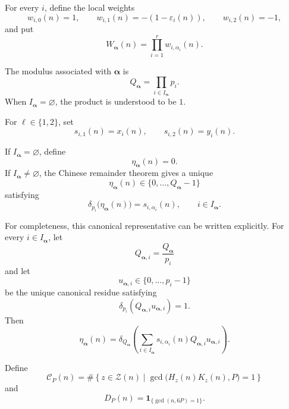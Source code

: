 \documentclass[12pt]{article}
\numberwithin{equation}{section}
\theoremstyle{definition}
\theoremstyle{remark}
\newcommand{\one}[1]{\mathbf 1_{\{#1\}}}
\newcommand{\Ccal}{\mathcal C}
\newcommand{\Zcal}{\mathcal Z}
\begin{document}
For every $i$, define the local weights
\begin{equation}
\label{eq:local-weights}
w_{i,0}(n)=1,
\qquad
w_{i,1}(n)=-(1-\varepsilon_i(n)),
\qquad
w_{i,2}(n)=-1,
\end{equation}
and put
\begin{equation}
\label{eq:global-weight}
W_{\boldsymbol\alpha}(n)
=
\prod_{i=1}^{r}w_{i,\alpha_i}(n).
\end{equation}

The modulus associated with $\boldsymbol\alpha$ is
\begin{equation}
\label{eq:Q-alpha}
Q_{\boldsymbol\alpha}
=
\prod_{i\in I_{\boldsymbol\alpha}}p_i.
\end{equation}
When $I_{\boldsymbol\alpha}=\varnothing$, the product is
understood to be $1$.

For $\ell\in\{1,2\}$, set
\begin{equation}
\label{eq:s-definition}
s_{i,1}(n)=x_i(n),
\qquad
s_{i,2}(n)=y_i(n).
\end{equation}

If $I_{\boldsymbol\alpha}=\varnothing$, define
\[
\eta_{\boldsymbol\alpha}(n)=0.
\]
If $I_{\boldsymbol\alpha}\neq\varnothing$, the Chinese remainder
theorem gives a unique
\[
\eta_{\boldsymbol\alpha}(n)
\in
\{0,\dots,Q_{\boldsymbol\alpha}-1\}
\]
satisfying
\begin{equation}
\label{eq:eta-crt}
\delta_{p_i}\bigl(\eta_{\boldsymbol\alpha}(n)\bigr)
=
s_{i,\alpha_i}(n),
\qquad
i\in I_{\boldsymbol\alpha}.
\end{equation}

For completeness, this canonical representative can be written
explicitly. For every $i\in I_{\boldsymbol\alpha}$, let
\[
Q_{\boldsymbol\alpha,i}
=
\frac{Q_{\boldsymbol\alpha}}{p_i}
\]
and let
\[
u_{\boldsymbol\alpha,i}
\in\{0,\dots,p_i-1\}
\]
be the unique canonical residue satisfying
\[
\delta_{p_i}
\left(
Q_{\boldsymbol\alpha,i}
u_{\boldsymbol\alpha,i}
\right)
=
1.
\]
Then
\begin{equation}
\label{eq:eta-explicit}
\eta_{\boldsymbol\alpha}(n)
=
\delta_{Q_{\boldsymbol\alpha}}
\left(
\sum_{i\in I_{\boldsymbol\alpha}}
s_{i,\alpha_i}(n)
Q_{\boldsymbol\alpha,i}
u_{\boldsymbol\alpha,i}
\right).
\end{equation}

Define
\begin{equation}
\label{eq:C-definition}
\Ccal_P(n)
=
\#\left\{
z\in\Zcal(n)
\mathrel{}\middle|\mathrel{}
\gcd\bigl(H_z(n)K_z(n),P\bigr)=1
\right\}
\end{equation}
and
\begin{equation}
\label{eq:D-definition}
D_P(n)
=
\one{\gcd(n,6P)=1}.
\end{equation}
\end{document}
